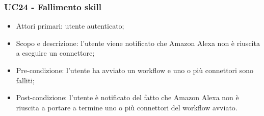 \subsubsection{UC24 - Fallimento skill}
\begin{itemize}
	\item  Attori primari: utente autenticato;
	\item  Scopo e descrizione: l'utente viene notificato che Amazon Alexa non è riuscita a eseguire un connettore;
	\item  Pre-condizione: l'utente ha avviato un workflow e uno o più connettori sono falliti;
	\item  Post-condizione: l'utente è notificato del fatto che Amazon Alexa non è riuscita a portare a termine uno o più connettori del workflow avviato.
\end{itemize}